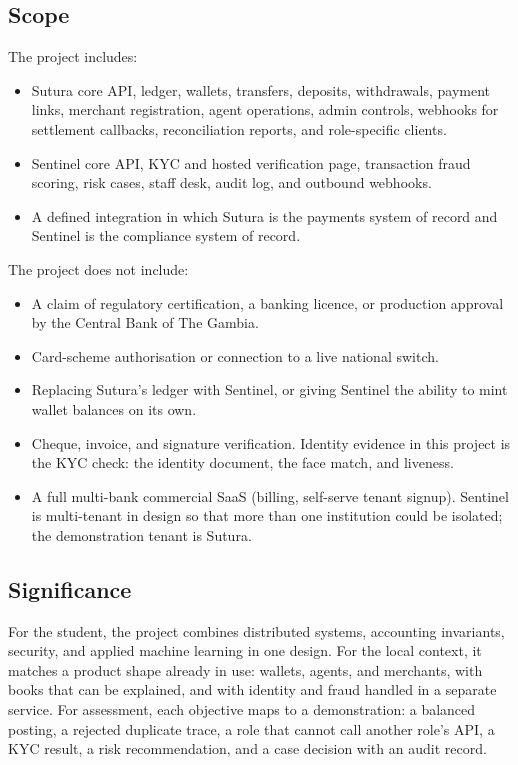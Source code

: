\documentclass[12pt,a4paper]{article}
\begin{document}
\subsection{Scope}

The project includes:

\begin{itemize}
  \item Sutura core API, ledger, wallets, transfers, deposits, withdrawals, payment links, merchant registration, agent operations, admin controls, webhooks for settlement callbacks, reconciliation reports, and role-specific clients.
  \item Sentinel core API, KYC and hosted verification page, transaction fraud scoring, risk cases, staff desk, audit log, and outbound webhooks.
  \item A defined integration in which Sutura is the payments system of record and Sentinel is the compliance system of record.
\end{itemize}

The project does not include:

\begin{itemize}
  \item A claim of regulatory certification, a banking licence, or production approval by the Central Bank of The Gambia.
  \item Card-scheme authorisation or connection to a live national switch.
  \item Replacing Sutura's ledger with Sentinel, or giving Sentinel the ability to mint wallet balances on its own.
  \item Cheque, invoice, and signature verification. Identity evidence in this project is the KYC check: the identity document, the face match, and liveness.
  \item A full multi-bank commercial SaaS (billing, self-serve tenant signup). Sentinel is multi-tenant in design so that more than one institution could be isolated; the demonstration tenant is Sutura.
\end{itemize}

\subsection{Significance}

For the student, the project combines distributed systems, accounting invariants, security, and applied machine learning in one design. For the local context, it matches a product shape already in use: wallets, agents, and merchants, with books that can be explained, and with identity and fraud handled in a separate service. For assessment, each objective maps to a demonstration: a balanced posting, a rejected duplicate trace, a role that cannot call another role's API, a KYC result, a risk recommendation, and a case decision with an audit record.
\end{document}
